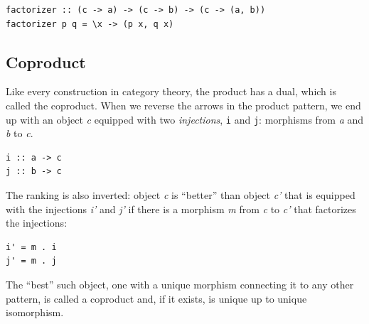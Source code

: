 \begin{verbatim}
factorizer :: (c -> a) -> (c -> b) -> (c -> (a, b))
factorizer p q = \x -> (p x, q x)
\end{verbatim}

\subsection{Coproduct}\label{coproduct}

Like every construction in category theory, the product has a dual,
which is called the coproduct. When we reverse the arrows in the product
pattern, we end up with an object \emph{c} equipped with two
\emph{injections}, \texttt{i} and \texttt{j}: morphisms from \emph{a}
and \emph{b} to \emph{c}.

\begin{verbatim}
i :: a -> c
j :: b -> c
\end{verbatim}

\begin{figure}[H]
  \centering
\end{figure}

\noindent
The ranking is also inverted: object \emph{c} is ``better'' than object
\emph{c'} that is equipped with the injections \emph{i'} and \emph{j'}
if there is a morphism \emph{m} from \emph{c} to \emph{c'} that
factorizes the injections:

\begin{verbatim}
i' = m . i
j' = m . j
\end{verbatim}

\begin{figure}[H]
  \centering
\end{figure}

\noindent
The ``best'' such object, one with a unique morphism connecting it to
any other pattern, is called a coproduct and, if it exists, is unique up
to unique isomorphism.

